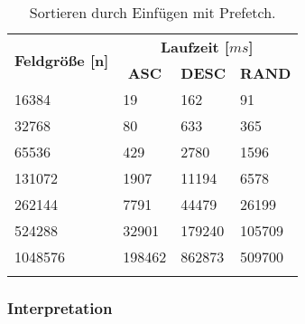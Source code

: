 \begin{center}
	\begin{longtable}{|p{5cm}|p{3cm}|p{3cm}|p{3cm}|}
		\hline
		
		\multirow{2}{5cm}{\centering \textbf{Feldgröße [n]}} & \multicolumn{3}{|c|}{ \textbf{Laufzeit [$ms$]}} \\\cline{2-4}
		& \multicolumn{1}{|c|}{\textbf{ASC}} & \multicolumn{1}{|c|}{\textbf{DESC}} &\multicolumn{1}{|c|}{\textbf{RAND}} \\
		\hhline{|=|=|=|=|}
		
		16384 & 19 & 162 & 91\\
		\hline
		32768 & 80 & 633 & 365\\
		\hline
		65536 & 429 & 2780 & 1596\\
		\hline
		131072 & 1907 & 11194 & 6578\\
		\hline
		262144 & 7791 & 44479 & 26199\\
		\hline
		524288 & 32901 & 179240 & 105709\\
		\hline
		1048576 & 198462 & 862873 & 509700\\
		\hline
		
		\caption{Sortieren durch Einfügen mit Prefetch.}
		\label{tab:insertionsort-v2}
	\end{longtable}
\end{center}

\subsubsection{Interpretation}
